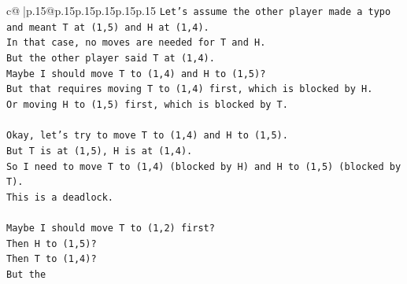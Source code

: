 \documentclass{article}
\begin{document}
{\begin{supertabular}{c@{$\;$}|p{.15\linewidth}@{}p{.15\linewidth}p{.15\linewidth}p{.15\linewidth}p{.15\linewidth}p{.15\linewidth}}
{{{\texttt{Let's assume the other player made a typo and meant T at (1,5) and H at (1,4).} \\
\texttt{In that case, no moves are needed for T and H.} \\
\texttt{But the other player said T at (1,4).} \\
\texttt{Maybe I should move T to (1,4) and H to (1,5)?} \\
\texttt{But that requires moving T to (1,4) first, which is blocked by H.} \\
\texttt{Or moving H to (1,5) first, which is blocked by T.} \\
\\ 
\texttt{Okay, let's try to move T to (1,4) and H to (1,5).} \\
\texttt{But T is at (1,5), H is at (1,4).} \\
\texttt{So I need to move T to (1,4) (blocked by H) and H to (1,5) (blocked by T).} \\
\texttt{This is a deadlock.} \\
\\ 
\texttt{Maybe I should move T to (1,2) first?} \\
\texttt{Then H to (1,5)?} \\
\texttt{Then T to (1,4)?} \\
\texttt{But the} \\
            }
        }
    }
     \\ \\


\end{supertabular}}
\end{document}
